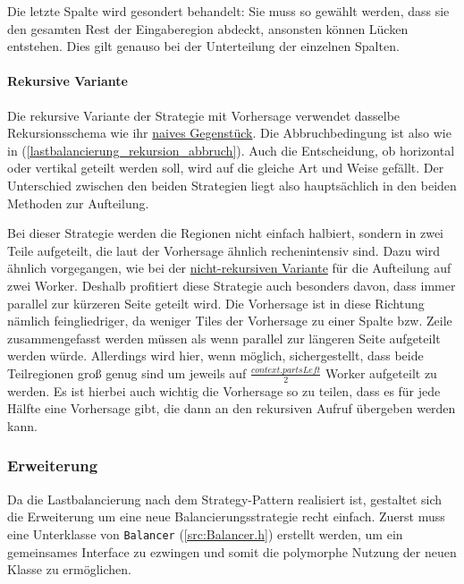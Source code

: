 Die letzte Spalte wird gesondert behandelt: Sie muss so gewählt werden, dass sie den gesamten Rest der Eingaberegion abdeckt, ansonsten können Lücken entstehen.
Dies gilt genauso bei der Unterteilung der einzelnen Spalten.

\begin{figure}
	
\end{figure}

\paragraph*{Rekursive Variante}
Die rekursive Variante der Strategie mit Vorhersage verwendet dasselbe Rekursionsschema wie ihr \hyperref[lastbalancierung_naiv_rekursion]{naives Gegenstück}.
Die Abbruchbedingung ist also wie in (\ref{lastbalancierung_rekursion_abbruch}).
Auch die Entscheidung, ob horizontal oder vertikal geteilt werden soll, wird auf die gleiche Art und Weise gefällt.
Der Unterschied zwischen den beiden Strategien liegt also hauptsächlich in den beiden Methoden zur Aufteilung.

Bei dieser Strategie werden die Regionen nicht einfach halbiert, sondern in zwei Teile aufgeteilt, die laut der Vorhersage ähnlich rechenintensiv sind.
Dazu wird ähnlich vorgegangen, wie bei der \hyperref[lastbalancierung_vorhersage]{nicht-rekursiven Variante} für die Aufteilung auf zwei Worker.
Deshalb profitiert diese Strategie auch besonders davon, dass immer parallel zur kürzeren Seite geteilt wird.
Die Vorhersage ist in diese Richtung nämlich feingliedriger, da weniger Tiles der Vorhersage zu einer Spalte bzw. Zeile zusammengefasst werden müssen als wenn parallel zur längeren Seite aufgeteilt werden würde.
Allerdings wird hier, wenn möglich, sichergestellt, dass beide Teilregionen groß genug sind um jeweils auf $\frac{context.partsLeft}{2}$ Worker aufgeteilt zu werden.
Es ist hierbei auch wichtig die Vorhersage so zu teilen, dass es für jede Hälfte eine Vorhersage gibt, die dann an den rekursiven Aufruf übergeben werden kann.

\subsubsection{Erweiterung}\label{lastbalancierung_erweiterung}

Da die Lastbalancierung nach dem Strategy-Pattern realisiert ist, gestaltet sich die Erweiterung um eine neue Balancierungsstrategie recht einfach.
Zuerst muss eine Unterklasse von \verb|Balancer| (\autoref{src:Balancer.h}) erstellt werden, um ein gemeinsames Interface zu ezwingen und somit die polymorphe Nutzung der neuen Klasse zu ermöglichen.

